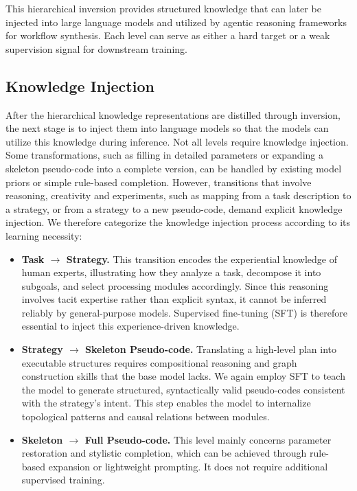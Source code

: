 \documentclass[runningheads]{llncs}
\begin{document}
This hierarchical inversion provides structured knowledge that can later be injected into large language models and utilized by agentic reasoning frameworks for workflow synthesis.
%
Each level can serve as either a hard target or a weak supervision signal for downstream training.


\subsection{Knowledge Injection}
%
After the hierarchical knowledge representations are distilled through inversion, the next stage is to inject them into language models so that the models can utilize this knowledge during inference.
%
Not all levels require knowledge injection.
%
Some transformations, such as filling in detailed parameters or expanding a skeleton pseudo-code into a complete version, can be handled by existing model priors or simple rule-based completion.
%
However, transitions that involve reasoning, creativity and experiments, such as mapping from a task description to a strategy, or from a strategy to a new pseudo-code, demand explicit knowledge injection.
%
We therefore categorize the knowledge injection process according to its learning necessity:
%
\begin{itemize}
\item \textbf{Task $\rightarrow$ Strategy.}
This transition encodes the experiential knowledge of human experts, illustrating how they analyze a task, decompose it into subgoals, and select processing modules accordingly.
Since this reasoning involves tacit expertise rather than explicit syntax, it cannot be inferred reliably by general-purpose models.
Supervised fine-tuning (SFT) is therefore essential to inject this experience-driven knowledge.

\item \textbf{Strategy $\rightarrow$ Skeleton Pseudo-code.}  
Translating a high-level plan into executable structures requires compositional reasoning and graph construction skills that the base model lacks.  
We again employ SFT to teach the model to generate structured, syntactically valid pseudo-codes consistent with the strategy’s intent.  
This step enables the model to internalize topological patterns and causal relations between modules.

\item \textbf{Skeleton $\rightarrow$ Full Pseudo-code.}  
This level mainly concerns parameter restoration and stylistic completion, which can be achieved through rule-based expansion or lightweight prompting.  
It does not require additional supervised training.


\end{itemize}
\end{document}
